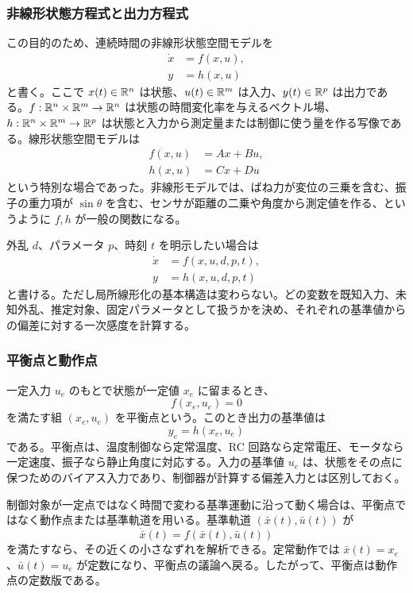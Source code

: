 \subsubsection{非線形状態方程式と出力方程式}

この目的のため、連続時間の非線形状態空間モデルを
\begin{align}
  \dot{x}&=f(x,u),\\
  y&=h(x,u)
\end{align}
と書く。ここで $x(t)\in\mathbb{R}^n$ は状態、$u(t)\in\mathbb{R}^m$ は入力、$y(t)\in\mathbb{R}^p$ は出力である。$f:\mathbb{R}^n\times\mathbb{R}^m\to\mathbb{R}^n$ は状態の時間変化率を与えるベクトル場、$h:\mathbb{R}^n\times\mathbb{R}^m\to\mathbb{R}^p$ は状態と入力から測定量または制御に使う量を作る写像である。線形状態空間モデルは
\begin{align}
  f(x,u)&=Ax+Bu,\\
  h(x,u)&=Cx+Du
\end{align}
という特別な場合であった。非線形モデルでは、ばね力が変位の三乗を含む、振子の重力項が $\sin\theta$ を含む、センサが距離の二乗や角度から測定値を作る、というように $f,h$ が一般の関数になる。

外乱 $d$、パラメータ $p$、時刻 $t$ を明示したい場合は
\begin{align}
  \dot{x}&=f(x,u,d,p,t),\\
  y&=h(x,u,d,p,t)
\end{align}
と書ける。ただし局所線形化の基本構造は変わらない。どの変数を既知入力、未知外乱、推定対象、固定パラメータとして扱うかを決め、それぞれの基準値からの偏差に対する一次感度を計算する。

\subsubsection{平衡点と動作点}

一定入力 $u_e$ のもとで状態が一定値 $x_e$ に留まるとき、
\begin{equation}
  f(x_e,u_e)=0
\end{equation}
を満たす組 $(x_e,u_e)$ を平衡点という。このとき出力の基準値は
\begin{equation}
  y_e=h(x_e,u_e)
\end{equation}
である。平衡点は、温度制御なら定常温度、RC 回路なら定常電圧、モータなら一定速度、振子なら静止角度に対応する。入力の基準値 $u_e$ は、状態をその点に保つためのバイアス入力であり、制御器が計算する偏差入力とは区別しておく。

制御対象が一定点ではなく時間で変わる基準運動に沿って動く場合は、平衡点ではなく動作点または基準軌道を用いる。基準軌道 $(\bar{x}(t),\bar{u}(t))$ が
\begin{equation}
  \dot{\bar{x}}(t)=f(\bar{x}(t),\bar{u}(t))
\end{equation}
を満たすなら、その近くの小さなずれを解析できる。定常動作では $\bar{x}(t)=x_e$、$\bar{u}(t)=u_e$ が定数になり、平衡点の議論へ戻る。したがって、平衡点は動作点の定数版である。


